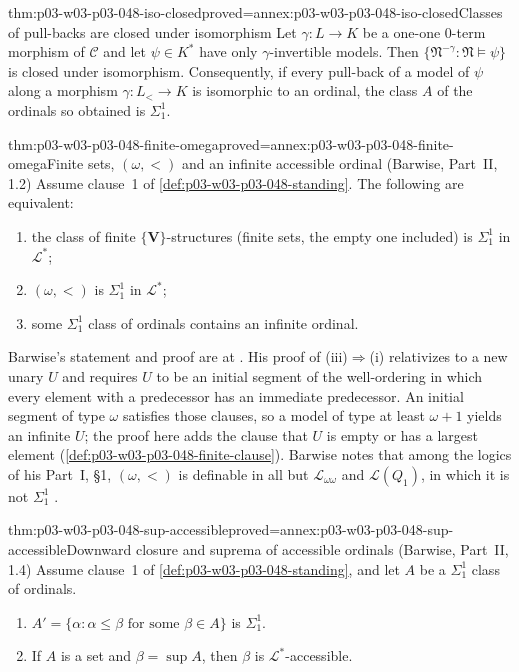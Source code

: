 \begin{hblemma}{thm:p03-w03-p03-048-iso-closed}{proved=annex:p03-w03-p03-048-iso-closed}{Classes of pull-backs are closed under isomorphism}
Let \(\gamma:L\to K\) be a one-one \(0\)-term morphism of \(\mathcal C\) and
let \(\psi\in K^{\ast}\) have only \(\gamma\)-invertible models.  Then
\(\{\mathfrak N^{-\gamma}:\mathfrak N\models\psi\}\) is closed under
isomorphism.  Consequently, if every pull-back of a model of \(\psi\) along a
morphism \(\gamma:L_{<}\to K\) is isomorphic to an ordinal, the class \(A\)
of the ordinals so obtained is \(\Sigma^1_1\).
\end{hblemma}

\begin{hbtheorem}{thm:p03-w03-p03-048-finite-omega}{proved=annex:p03-w03-p03-048-finite-omega}{Finite sets, \((\omega,<)\) and an infinite accessible ordinal (Barwise, Part~II, 1.2)}
Assume clause~1 of \cref{def:p03-w03-p03-048-standing}.  The following are
equivalent:
\begin{enumerate}
\item the class of finite \(\{\mathbf V\}\)-structures (finite sets, the
      empty one included) is \(\Sigma^1_1\) in \(\mathcal L^{\ast}\);
\item \((\omega,<)\) is \(\Sigma^1_1\) in \(\mathcal L^{\ast}\);
\item some \(\Sigma^1_1\) class of ordinals contains an infinite ordinal.
\end{enumerate}
\end{hbtheorem}

Barwise's statement and proof are at \cite[Part~II, \S1, 1.2,
pp.~249--250]{Barwise1974Axioms}.  His proof of
(iii)\(\Rightarrow\)(i) relativizes to a new unary \(U\) and requires \(U\)
to be an initial segment of the well-ordering in which every element with a
predecessor has an immediate predecessor.  An initial segment of type
\(\omega\) satisfies those clauses, so a model of type at least
\(\omega+1\) yields an infinite \(U\); the proof here adds the clause that
\(U\) is empty or has a largest element
(\cref{def:p03-w03-p03-048-finite-clause}).  Barwise notes that among the
logics of his Part~I, \S1, \((\omega,<)\) is definable in all but
\(\mathcal L_{\omega\omega}\) and \(\mathcal L(Q_1)\), in which it is not
\(\Sigma^1_1\) \cite[p.~250]{Barwise1974Axioms}.

\begin{hbtheorem}{thm:p03-w03-p03-048-sup-accessible}{proved=annex:p03-w03-p03-048-sup-accessible}{Downward closure and suprema of accessible ordinals (Barwise, Part~II, 1.4)}
Assume clause~1 of \cref{def:p03-w03-p03-048-standing}, and let \(A\) be a
\(\Sigma^1_1\) class of ordinals.
\begin{enumerate}
\item \(A'=\{\alpha:\alpha\leq\beta\text{ for some }\beta\in A\}\) is
      \(\Sigma^1_1\).
\item If \(A\) is a set and \(\beta=\sup A\), then \(\beta\) is
      \(\mathcal L^{\ast}\)-accessible.
\end{enumerate}
\end{hbtheorem}

